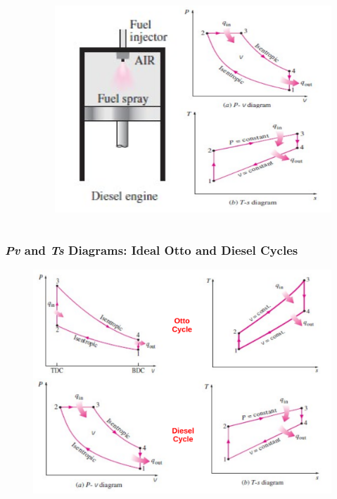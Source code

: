 \documentclass[10pt,compress]{beamer}
\begin{document}
\begin{frame}
\begin{columns}
\begin{column}[c]{0.6\linewidth}
\begin{enumerate}[(1)]
\begin{enumerate}[(a)]
        \end{enumerate}
    \end{enumerate}
   \end{column}
   \begin{column}[c]{0.4\linewidth}
    \begin{figure}%
     \begin{center}
      \includegraphics[width=5.cm,clip]{./Pics/InternalCombustion_IdealDieselCycle}
     \end{center}
    \end{figure}   
   \end{column}  
  \end{columns}
\end{frame}

\begin{frame}
 \frametitle{{\it Pv} and {\it Ts} Diagrams: Ideal Otto and Diesel Cycles}
    \begin{figure}%
     \begin{center}
      \includegraphics[width=10.cm,clip]{./Pics/InternalCombustion_IdealOttoxDieselCycles}
     \end{center}
    \end{figure}   
\end{frame}
\end{document}
